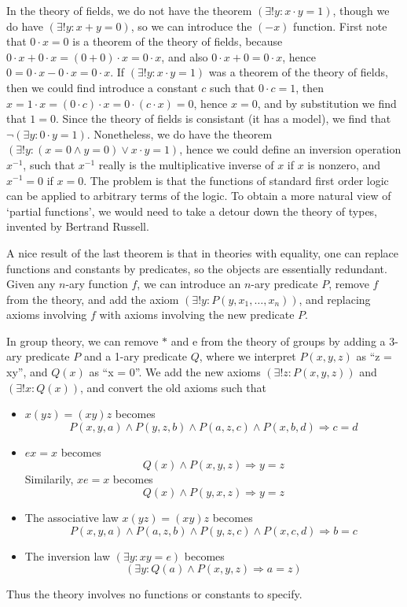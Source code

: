 \begin{example}
    In the theory of fields, we do not have the theorem $(\exists ! y : x \cdot y = 1)$, though we do have $(\exists ! y : x + y = 0)$, so we can introduce the $(-x)$ function. First note that $0 \cdot x = 0$ is a theorem of the theory of fields, because $0 \cdot x + 0 \cdot x = (0 + 0) \cdot x = 0 \cdot x$, and also $0 \cdot x + 0 = 0 \cdot x$, hence $0 = 0 \cdot x - 0 \cdot x = 0 \cdot x$. If $(\exists ! y : x \cdot y = 1)$ was a theorem of the theory of fields, then we could find introduce a constant $c$ such that $0 \cdot c = 1$, then $x = 1 \cdot x = (0 \cdot c) \cdot x = 0 \cdot (c \cdot x) = 0$, hence $x = 0$, and by substitution we find that $1 = 0$. Since the theory of fields is consistant (it has a model), we find that $\neg (\exists y: 0 \cdot y = 1)$. Nonetheless, we do have the theorem $(\exists ! y: (x = 0 \wedge y = 0) \vee x \cdot y = 1)$, hence we could define an inversion operation $x^{-1}$, such that $x^{-1}$ really is the multiplicative inverse of $x$ if $x$ is nonzero, and $x^{-1} = 0$ if $x = 0$. The problem is that the functions of standard first order logic can be applied to arbitrary terms of the logic. To obtain a more natural view of `partial functions', we would need to take a detour down the theory of types, invented by Bertrand Russell.
\end{example}

A nice result of the last theorem is that in theories with equality, one can replace functions and constants by predicates, so the objects are essentially redundant. Given any $n$-ary function $f$, we can introduce an $n$-ary predicate $P$, remove $f$ from the theory, and add the axiom $(\exists ! y: P(y,x_1,\dots,x_n))$, and replacing axioms involving $f$ with axioms involving the new predicate $P$.

\begin{example}
    In group theory, we can remove $*$ and e from the theory of groups by adding a 3-ary predicate $P$ and a 1-ary predicate $Q$, where we interpret $P(x,y,z)$ as ``z = xy'', and $Q(x)$ as ``x = 0''. We add the new axioms $(\exists ! z : P(x,y,z))$ and $(\exists ! x : Q(x))$, and convert the old axioms such that
    \begin{itemize}
        \item $x(yz) = (xy)z$ becomes
        \[ P(x,y,a) \wedge P(y,z,b) \wedge P(a,z,c) \wedge P(x,b,d) \Rightarrow c = d \]
        \item $ex = x$ becomes
        \[ Q(x) \wedge P(x,y,z) \Rightarrow y = z \]
        Similarily, $xe = x$ becomes
        \[ Q(x) \wedge P(y,x,z) \Rightarrow y = z \]
        \item The associative law $x(yz) = (xy)z$ becomes
        \[ P(x,y,a) \wedge P(a,z,b) \wedge P(y,z,c) \wedge P(x,c,d) \Rightarrow b = c \]
        \item The inversion law $(\exists y: xy = e)$ becomes
        \[ (\exists y: Q(a) \wedge P(x,y,z) \Rightarrow a = z) \]
    \end{itemize}
    Thus the theory involves no functions or constants to specify.
\end{example}


